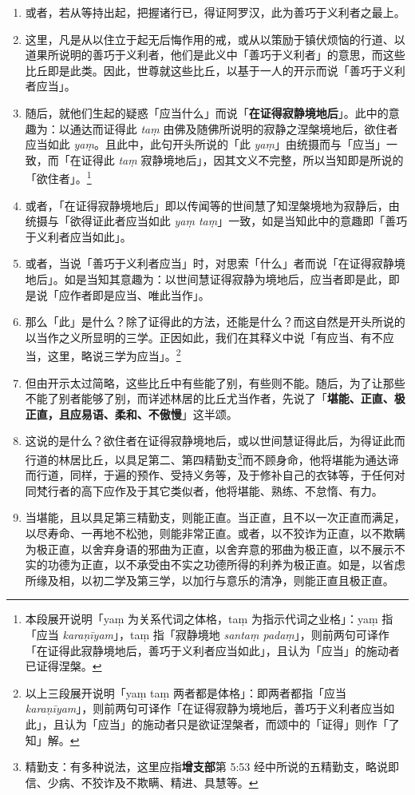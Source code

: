 \begin{enumerate}
\item 或者，若从等持出起，把握诸行已，得证阿罗汉，此为善巧于义利者之最上。
\item 这里，凡是从以住立于起无后悔作用的戒，或从以策励于镇伏烦恼的行道、以道果所说明的善巧于义利者，他们是此义中「善巧于义利者」的意思，而这些比丘即是此类。因此，世尊就这些比丘，以基于一人的开示而说「善巧于义利者应当」。
\item 随后，就他们生起的疑惑「应当什么」而说「\textbf{在证得寂静境地后}」。此中的意趣为：以通达而证得此 \textit{taṃ} 由佛及随佛所说明的寂静之涅槃境地后，欲住者应当如此 \textit{yaṃ}。且此中，此句开头所说的「此 \textit{yaṃ}」由统摄而与「应当」一致，而「在证得此 \textit{taṃ} 寂静境地后」，因其文义不完整，所以当知即是所说的「欲住者」。\footnote{本段展开说明「yaṃ 为关系代词之体格，taṃ 为指示代词之业格」：yaṃ 指「应当 \textit{karaṇīyam}」，taṃ 指「寂静境地 \textit{santaṃ padaṃ}」，则前两句可译作「在证得此寂静境地后，善巧于义利者应当如此」，且认为「应当」的施动者已证得涅槃。}
\item 或者，「在证得寂静境地后」即以传闻等的世间慧了知涅槃境地为寂静后，由统摄与「欲得证此者应当如此 \textit{yaṃ taṃ}」一致，如是当知此中的意趣即「善巧于义利者应当如此」。
\item 或者，当说「善巧于义利者应当」时，对思索「什么」者而说「在证得寂静境地后」。如是当知其意趣为：以世间慧证得寂静为境地后，应当者即是此，即是说「应作者即是应当、唯此当作」。
\item 那么「此」是什么？除了证得此的方法，还能是什么？而这自然是开头所说的以当作之义所显明的三学。正因如此，我们在其释义中说「有应当、有不应当，这里，略说三学为应当」。\footnote{以上三段展开说明「yaṃ taṃ 两者都是体格」：即两者都指「应当 \textit{karaṇīyam}」，则前两句可译作「在证得寂静为境地后，善巧于义利者应当如此」，且认为「应当」的施动者只是欲证涅槃者，而颂中的「证得」则作「了知」解。}
\item 但由开示太过简略，这些比丘中有些能了别，有些则不能。随后，为了让那些不能了别者能够了别，而详述林居的比丘尤当作者，先说了「\textbf{堪能、正直、极正直，且应易语、柔和、不傲慢}」这半颂。
\item 这说的是什么？欲住者在证得寂静境地后，或以世间慧证得此后，为得证此而行道的林居比丘，以具足第二、第四精勤支\footnote{精勤支：有多种说法，这里应指\textbf{增支部}第 5:53 经中所说的五精勤支，略说即信、少病、不狡诈及不欺瞒、精进、具慧等。}而不顾身命，他将堪能为通达谛而行道，同样，于遍的预作、受持义务等，及于修补自己的衣钵等，于任何对同梵行者的高下应作及于其它类似者，他将堪能、熟练、不怠惰、有力。
\item 当堪能，且以具足第三精勤支，则能正直。当正直，且不以一次正直而满足，以尽寿命、一再地不松弛，则能非常正直。或者，以不狡诈为正直，以不欺瞒为极正直，以舍弃身语的邪曲为正直，以舍弃意的邪曲为极正直，以不展示不实的功德为正直，以不承受由不实之功德所得的利养为极正直。如是，以省虑所缘及相，以初二学及第三学，以加行与意乐的清净，则能正直且极正直。

\end{enumerate}
